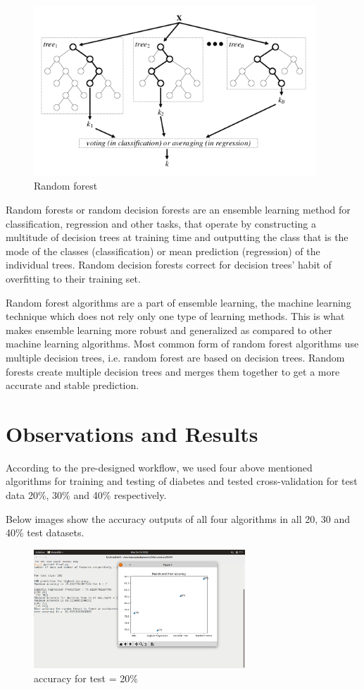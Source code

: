 \documentclass{article}
\begin{document}
\begin{enumerate}
	\begin{figure}[h]
		\centering
		\includegraphics[width=400px]{random_forest.png}
		\caption{Random forest}
	\end{figure}
	Random forests or random decision forests are an ensemble learning method for classification, regression and other tasks, that operate by constructing a multitude of decision trees at training time and outputting the class that is the mode of the classes (classification) or mean prediction (regression) of the individual trees. Random decision forests correct for decision trees' habit of overfitting to their training set.
	\par Random forest algorithms are a part of ensemble learning, the machine learning technique which does not rely only one type of learning methods. This is what makes ensemble learning more robust and generalized as compared to other machine learning algorithms. Most common form of random forest algorithms use multiple decision trees, i.e. random forest are based on decision trees. Random forests create multiple decision trees and merges them together to get a more accurate and stable prediction.	
\end{enumerate}

\newpage
\section{Observations and Results}
\par According to the pre-designed workflow, we used four above mentioned algorithms for training and testing of diabetes and tested cross-validation for test data 20\%, 30\% and 40\% respectively.
\par Below images show the accuracy outputs of all four algorithms in all 20, 30 and 40\% test datasets.

\begin{figure}[h]
	\centering
	\includegraphics[width=300px]{output_20.png}
	\caption{accuracy for test = 20\%}
\end{figure}
\end{document}
